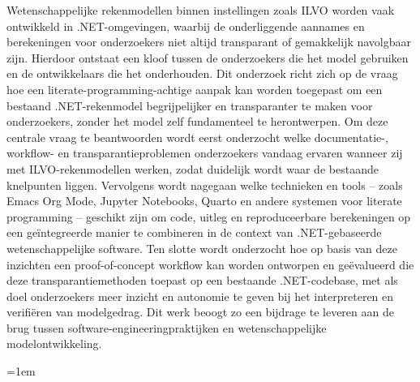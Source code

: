 \documentclass[dutch,dit,thesis]{hogentreport}
\begin{document}
  Wetenschappelijke rekenmodellen binnen instellingen zoals ILVO worden vaak ontwikkeld in .NET-omgevingen, waarbij de onderliggende aannames en berekeningen voor onderzoekers niet altijd transparant of gemakkelijk navolgbaar zijn. Hierdoor ontstaat een kloof tussen de onderzoekers die het model gebruiken en de ontwikkelaars die het onderhouden. Dit onderzoek richt zich op de vraag hoe een literate-programming-achtige aanpak kan worden toegepast om een bestaand .NET-rekenmodel begrijpelijker en transparanter te maken voor onderzoekers, zonder het model zelf fundamenteel te herontwerpen. Om deze centrale vraag te beantwoorden wordt eerst onderzocht welke documentatie-, workflow- en transparantieproblemen onderzoekers vandaag ervaren wanneer zij met ILVO-rekenmodellen werken, zodat duidelijk wordt waar de bestaande knelpunten liggen. Vervolgens wordt nagegaan welke technieken en tools – zoals Emacs Org Mode, Jupyter Notebooks, Quarto en andere systemen voor literate programming – geschikt zijn om code, uitleg en reproduceerbare berekeningen op een geïntegreerde manier te combineren in de context van .NET-gebaseerde wetenschappelijke software. Ten slotte wordt onderzocht hoe op basis van deze inzichten een proof-of-concept workflow kan worden ontworpen en geëvalueerd die deze transparantiemethoden toepast op een bestaande .NET-codebase, met als doel onderzoekers meer inzicht en autonomie te geven bij het interpreteren en verifiëren van modelgedrag. Dit werk beoogt zo een bijdrage te leveren aan de brug tussen software-engineeringpraktijken en wetenschappelijke modelontwikkeling.


%


\backmatter{}

\setlength\bibitemsep{2pt} %
\begingroup
\emergencystretch=1em
\printbibliography[heading=bibintoc]
\endgroup
\end{document}
